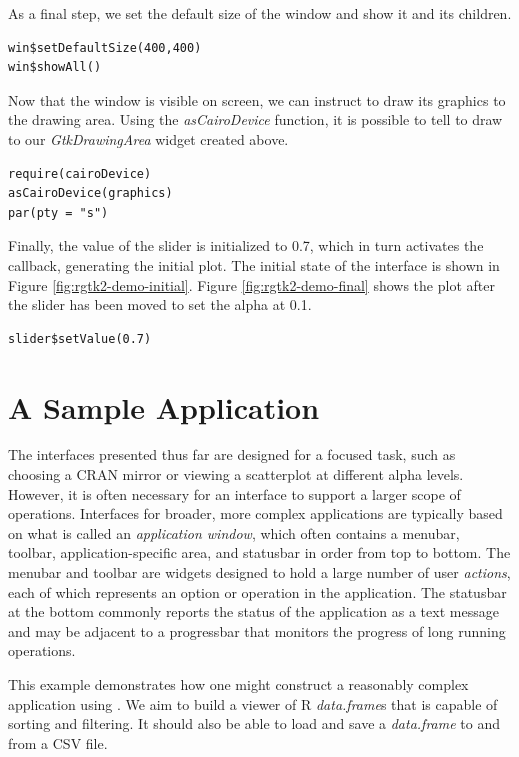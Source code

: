 \documentclass[article]{jss}
\begin{document}
As a final step, we set the default size of the window and show it and its children.
\begin{verbatim}
win$setDefaultSize(400,400)
win$showAll() 
\end{verbatim}

Now that the window is visible on screen, we can instruct  to draw
its graphics to the drawing area. Using the \emph{asCairoDevice} function, it is possible
to tell  to draw to our \emph{GtkDrawingArea} widget created above.
\begin{verbatim}
require(cairoDevice)
asCairoDevice(graphics)
par(pty = "s")
\end{verbatim}

Finally, the value of the slider is initialized to 0.7, which in turn
activates the callback, generating the initial plot. The initial state
of the interface is shown in Figure \ref{fig:rgtk2-demo-initial}.
Figure \ref{fig:rgtk2-demo-final} shows the plot after the slider has been
moved to set the alpha at 0.1.
\begin{verbatim}
slider$setValue(0.7)
\end{verbatim}

\section{A Sample Application}\label{sec:spreadsheet-example}

The interfaces presented thus far are designed for a focused task, such as 
choosing a CRAN mirror or viewing a scatterplot at different alpha levels.
However, it is often necessary for an interface to support a larger scope of
operations. Interfaces for broader, more complex applications are typically based on 
what is called an \emph{application window}, which often contains a menubar, 
toolbar, application-specific area, and statusbar in order from top to bottom. The
menubar and toolbar are widgets designed to hold a large number of user 
\emph{actions}, each of which represents an option or operation in the application.
The statusbar at the bottom commonly reports the status of the application
as a text message and may be adjacent to a progressbar that monitors
the progress of long running operations.

This example demonstrates how one might construct a reasonably complex
application using . We aim to build a viewer of R \emph{data.frame}s that
is capable of sorting and filtering. It should also be able to load and save
a \emph{data.frame} to and from a CSV file. 
\end{document}

